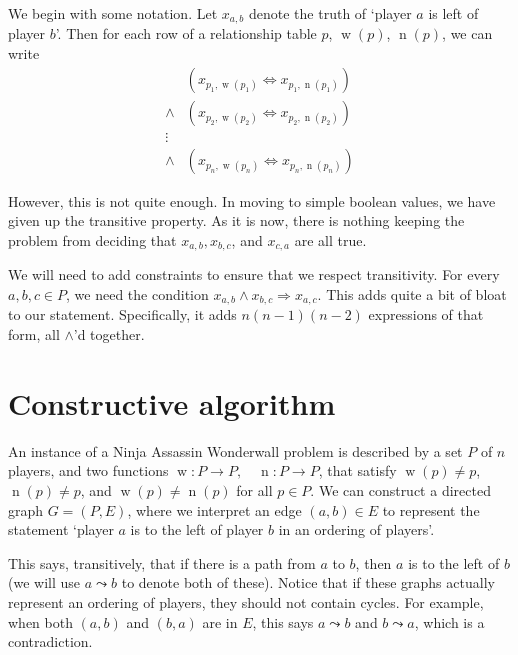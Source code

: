 \documentclass[12pt]{article}
\DeclareMathOperator{\w}{w}
\DeclareMathOperator{\n}{n}
\begin{document}
We begin with some notation. Let $x_{a,b}$ denote the truth of `player $a$ is left of player $b$'. Then for each row of a relationship table $p$, $\w(p)$, $\n(p)$, we can write
    \begin{align*}
                & (x_{p_1, \w(p_1)} \Leftrightarrow x_{p_1, \n(p_1)})\\
        \wedge  & (x_{p_2, \w(p_2)} \Leftrightarrow x_{p_2, \n(p_2)})\\
        \vdots  &\\
        \wedge  & (x_{p_n, \w(p_n)} \Leftrightarrow x_{p_n, \n(p_n)})
    \end{align*}

However, this is not quite enough. In moving to simple boolean values, we have given up the transitive property. As it is now, there is nothing keeping the problem from deciding that $x_{a,b}, x_{b,c}$, and $x_{c,a}$ are all true.

We will need to add constraints to ensure that we respect transitivity. For every $a,b,c \in P$, we need the condition $x_{a,b} \wedge x_{b,c} \Rightarrow x_{a,c}$. This adds quite a bit of bloat to our statement. Specifically, it adds $n(n-1)(n-2)$ expressions of that form, all $\wedge$'d together.

\section{Constructive algorithm}
An instance of a Ninja Assassin Wonderwall problem is described by a set $P$ of $n$ players, and two functions $\w : P \to P, \quad \n : P \to P$, that satisfy $\w(p) \neq p$, $\n(p) \neq p$, and $\w(p) \neq \n(p)$ for all $p\in P$. We can construct a directed graph $G=(P,E)$, where we interpret an edge $(a,b) \in E$ to represent the statement `player $a$ is to the left of player $b$ in an ordering of players'. 

This says, transitively, that if there is a path from $a$ to $b$, then $a$ is to the left of $b$ (we will use $a \leadsto b$ to denote both of these). Notice that if these graphs actually represent an ordering of players, they should not contain cycles. For example, when both $(a,b)$ and $(b,a)$ are in $E$, this says $a \leadsto b$ and $b \leadsto a$, which is a contradiction. 
\end{document}
